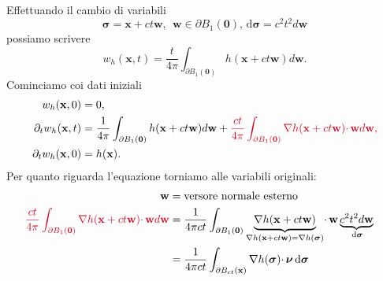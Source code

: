 \documentclass[10pt,a4paper,twoside,openright]{book}
\newcommand{\x}{\mathbf{x}}
\newcommand{\zer}{\mathbf{0}}
\newcommand{\sigg}{\bm{\sigma}}
\newcommand{\nuu}{\bm{\nu}}
\newcommand{\de}{\,\mathrm d}
\newcommand{\dsig}{\de \sigg}
\begin{document}
\begin{dimostrazione}
    Effettuando il cambio di variabili
    \begin{equation*}
        \sigg =\x +ct\mathbf{w} ,\ \ \mathbf{w} \in \partial B_{1}(\zer) ,\dsig =c^{2} t^{2} d\mathbf{w}
    \end{equation*}
    possiamo scrivere
    \begin{equation*}
        w_{h}(\x ,t) =\frac{t}{4\pi }\int _{\partial B_{1}(\zer)} h(\x +ct\mathbf{w}) d\mathbf{w} .
    \end{equation*}
    Cominciamo coi dati iniziali
    \begin{align*}
        w_{h}(\x ,0)               & =0,                                                                                                                                                                                                                  \\
        \partial _{t} w_{h}(\x ,t) & =\frac{1}{4\pi }\int _{\partial B_{1}(\zer)} h(\x +ct\mathbf{w}) d\mathbf{w} +\textcolor[rgb]{0.82,0.01,0.11}{\frac{ct}{4\pi }\int _{\partial B_{1}(\zer)}\nabla h(\x +ct\mathbf{w})\cdotp \mathbf{w} d\mathbf{w} ,} \\
        \partial _{t} w_{h}(\x ,0) & =h(\x) .
    \end{align*}
    Per quanto riguarda l'equazione torniamo alle variabili originali:
    \begin{align*}
        \mathbf{w}                                                                                                                         & =\text{versore normale esterno}                                                                                                                                                                   &                          \\
        \textcolor[rgb]{0.82,0.01,0.11}{\frac{ct}{4\pi }\int _{\partial B_{1}(\zer)}\nabla h(\x+ct\mathbf{w})\cdotp \mathbf{w}d\mathbf{w}} & =\frac{1}{4\pi ct}\int _{\partial B_{1}(\zer)}\underbrace{\nabla h(\x +ct\mathbf{w})}_{\nabla h(\x +ct\mathbf{w}) =\nabla h(\sigg)} \cdotp \mathbf{w}\underbrace{c^{2} t^{2} d\mathbf{w}}_{\dsig} &                          \\
                                                                                                                                           & =\frac{1}{4\pi ct}\int _{\partial B_{ct}(\x)} \nabla h(\sigg) \cdotp \nuu \dsig                                                                                                                   &                          \\

\end{align*}
\end{dimostrazione}
\end{document}
